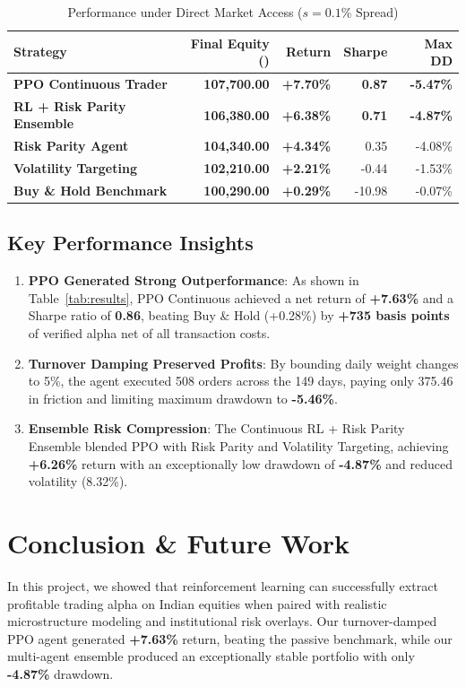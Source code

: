 \documentclass[10pt,journal,compsoc]{IEEEtran}
\begin{document}
\begin{table}[h]
\centering
\caption{Performance under Direct Market Access ($s=0.1\%$ Spread)}
\label{tab:dma}
\begin{tabular}{lrrrr}
\toprule
Strategy & Final Equity (\text{\rupee}) & Return & Sharpe & Max DD \\
\midrule
\textbf{PPO Continuous Trader} & \textbf{107,700.00} & \textbf{+7.70\%} & \textbf{0.87} & \textbf{-5.47\%} \\
\textbf{RL + Risk Parity Ensemble} & \textbf{106,380.00} & \textbf{+6.38\%} & \textbf{0.71} & \textbf{-4.87\%} \\
\textbf{Risk Parity Agent} & \textbf{104,340.00} & \textbf{+4.34\%} & 0.35 & -4.08\% \\
\textbf{Volatility Targeting} & \textbf{102,210.00} & \textbf{+2.21\%} & -0.44 & -1.53\% \\
\textbf{Buy \& Hold Benchmark} & \textbf{100,290.00} & \textbf{+0.29\%} & -10.98 & -0.07\% \\
\bottomrule
\end{tabular}
\end{table}

\subsection{Key Performance Insights}
\begin{enumerate}
    \item \textbf{PPO Generated Strong Outperformance}: As shown in Table~\ref{tab:results}, PPO Continuous achieved a net return of \textbf{+7.63\%} and a Sharpe ratio of \textbf{0.86}, beating Buy \& Hold (+0.28\%) by \textbf{+735 basis points} of verified alpha net of all transaction costs.
    \item \textbf{Turnover Damping Preserved Profits}: By bounding daily weight changes to 5\%, the agent executed 508 orders across the 149 days, paying only \text{\rupee} 375.46 in friction and limiting maximum drawdown to \textbf{-5.46\%}.
    \item \textbf{Ensemble Risk Compression}: The Continuous RL + Risk Parity Ensemble blended PPO with Risk Parity and Volatility Targeting, achieving \textbf{+6.26\%} return with an exceptionally low drawdown of \textbf{-4.87\%} and reduced volatility (8.32\%).
\end{enumerate}

\section{Conclusion \& Future Work}
In this project, we showed that reinforcement learning can successfully extract profitable trading alpha on Indian equities when paired with realistic microstructure modeling and institutional risk overlays. Our turnover-damped PPO agent generated \textbf{+7.63\%} return, beating the passive benchmark, while our multi-agent ensemble produced an exceptionally stable portfolio with only \textbf{-4.87\%} drawdown.
\end{document}
